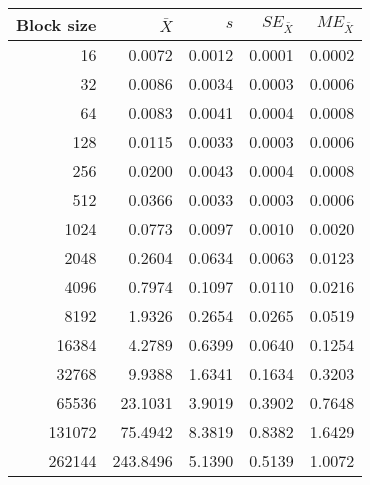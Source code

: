 \begin{tabular}{rrrrr}\toprule
{\small Block size} & $\bar{X}$ & $s$ & $SE_{\bar{X}}$ & $ME_{\bar{X}}$ \\\midrule
16 & 0.0072 & 0.0012 & 0.0001 & 0.0002\\
32 & 0.0086 & 0.0034 & 0.0003 & 0.0006\\
64 & 0.0083 & 0.0041 & 0.0004 & 0.0008\\
128 & 0.0115 & 0.0033 & 0.0003 & 0.0006\\
256 & 0.0200 & 0.0043 & 0.0004 & 0.0008\\
512 & 0.0366 & 0.0033 & 0.0003 & 0.0006\\
1024 & 0.0773 & 0.0097 & 0.0010 & 0.0020\\
2048 & 0.2604 & 0.0634 & 0.0063 & 0.0123\\
4096 & 0.7974 & 0.1097 & 0.0110 & 0.0216\\
8192 & 1.9326 & 0.2654 & 0.0265 & 0.0519\\
16384 & 4.2789 & 0.6399 & 0.0640 & 0.1254\\
32768 & 9.9388 & 1.6341 & 0.1634 & 0.3203\\
65536 & 23.1031 & 3.9019 & 0.3902 & 0.7648\\
131072 & 75.4942 & 8.3819 & 0.8382 & 1.6429\\
262144 & 243.8496 & 5.1390 & 0.5139 & 1.0072\\
\bottomrule
\end{tabular}
